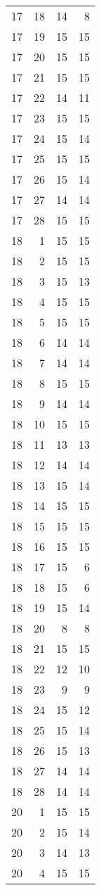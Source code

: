 \documentclass[
]{article}
\begin{document}
\begin{longtable}[]{@{}rrrr@{}}
17 & 18 & 14 & 8 \\
17 & 19 & 15 & 15 \\
17 & 20 & 15 & 15 \\
17 & 21 & 15 & 15 \\
17 & 22 & 14 & 11 \\
17 & 23 & 15 & 15 \\
17 & 24 & 15 & 14 \\
17 & 25 & 15 & 15 \\
17 & 26 & 15 & 14 \\
17 & 27 & 14 & 14 \\
17 & 28 & 15 & 15 \\
18 & 1 & 15 & 15 \\
18 & 2 & 15 & 15 \\
18 & 3 & 15 & 13 \\
18 & 4 & 15 & 15 \\
18 & 5 & 15 & 15 \\
18 & 6 & 14 & 14 \\
18 & 7 & 14 & 14 \\
18 & 8 & 15 & 15 \\
18 & 9 & 14 & 14 \\
18 & 10 & 15 & 15 \\
18 & 11 & 13 & 13 \\
18 & 12 & 14 & 14 \\
18 & 13 & 15 & 14 \\
18 & 14 & 15 & 15 \\
18 & 15 & 15 & 15 \\
18 & 16 & 15 & 15 \\
18 & 17 & 15 & 6 \\
18 & 18 & 15 & 6 \\
18 & 19 & 15 & 14 \\
18 & 20 & 8 & 8 \\
18 & 21 & 15 & 15 \\
18 & 22 & 12 & 10 \\
18 & 23 & 9 & 9 \\
18 & 24 & 15 & 12 \\
18 & 25 & 15 & 14 \\
18 & 26 & 15 & 13 \\
18 & 27 & 14 & 14 \\
18 & 28 & 14 & 14 \\
20 & 1 & 15 & 15 \\
20 & 2 & 15 & 14 \\
20 & 3 & 14 & 13 \\
20 & 4 & 15 & 15 \\

\end{longtable}
\end{document}
